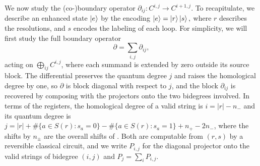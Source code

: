 \documentclass[a4paper,onecolumn,unpublished]{quantumarticle}
\theoremstyle{plain}
\theoremstyle{definition}
\theoremstyle{definition}
\numberwithin{equation}{section}
\newcommand{\del}{\partial}
\renewcommand{\to}{\rightarrow}
\begin{document}
We now study the (co-)boundary operator $\del_{ij}: C^{i,j} \to C^{i+1,j}$. To recapitulate, we describe an enhanced state $\ket{e}$ by the encoding $
    \ket{e} = \ket{r}\ket{s},
$
where $r$ describes the resolutions,  
and $s$ encodes the labeling of each loop. For simplicity, we will first study the full boundary operator \begin{equation}
    \del = \sum_{i,j} \del_{ij},
\end{equation} acting on $\bigoplus_{ij} C^{i,j}$, where each summand is extended by zero outside its source block.  The differential preserves the quantum degree $j$ and raises the homological degree by one, so $\del$ is block diagonal with respect to $j$, and the block $\del_{ij}$ is recovered by composing with the projectors onto the two bidegrees involved.  In terms of the registers, the homological degree of a valid string is $i=|r|-n_-$ and its quantum degree is $j=|r|+\#\{a\in S(r):s_a=0\}-\#\{a\in S(r):s_a=1\}+n_+-2n_-$, where the shifts by $n_\pm$ are the overall shifts of .  Both are computable from $(r,s)$ by a reversible classical circuit, and we write $P_{i,j}$ for the diagonal projector onto the valid strings of bidegree $(i,j)$ and $P_j=\sum_i P_{i,j}$.
\end{document}
